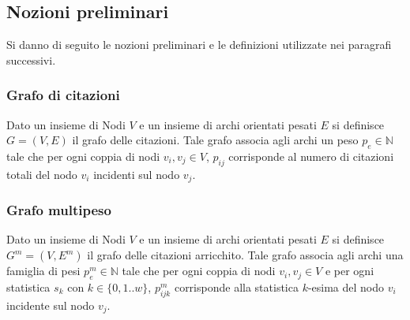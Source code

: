 \documentclass[a4paper, 12pt]{article}
\begin{document}
\subsection{Nozioni preliminari}
Si danno di seguito le nozioni preliminari e le definizioni utilizzate nei paragrafi successivi.
\subsubsection{Grafo di citazioni}
Dato un insieme di Nodi $V$ e un insieme di archi orientati pesati $E$ si definisce $G = (V,E)$ il grafo delle citazioni. Tale grafo associa agli archi un peso $p_e\in\mathbb{N}$ tale che per ogni coppia di nodi $v_i, v_j \in V$, $p_{ij}$ corrisponde al numero di citazioni totali del nodo $v_i$ incidenti sul nodo $v_j$.
\subsubsection{Grafo multipeso}
Dato un insieme di Nodi $V$ e un insieme di archi orientati pesati $E$ si definisce $G^m = (V,E^m)$ il grafo delle citazioni arricchito. Tale grafo associa agli archi una famiglia di pesi $p^m_e\in\mathbb{N}$ tale che per ogni coppia di nodi $v_i, v_j \in V$ e per ogni statistica $s_k$ con $k \in \{0,1..w \}$, $p^m_{ijk}$ corrisponde alla statistica $k$-esima del nodo $v_i$ incidente sul nodo $v_j$.
\end{document}

